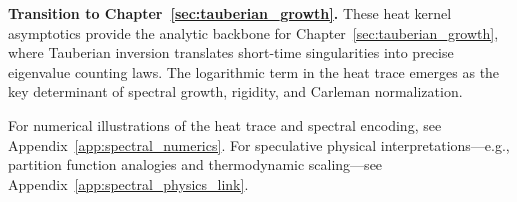 \medskip

\noindent\textbf{Transition to Chapter~\ref{sec:tauberian_growth}.}  
These heat kernel asymptotics provide the analytic backbone for Chapter~\ref{sec:tauberian_growth}, where Tauberian inversion translates short-time singularities into precise eigenvalue counting laws. The logarithmic term in the heat trace emerges as the key determinant of spectral growth, rigidity, and Carleman normalization.

\medskip
\noindent
For numerical illustrations of the heat trace and spectral encoding, see Appendix~\ref{app:spectral_numerics}. For speculative physical interpretations—e.g., partition function analogies and thermodynamic scaling—see Appendix~\ref{app:spectral_physics_link}.
